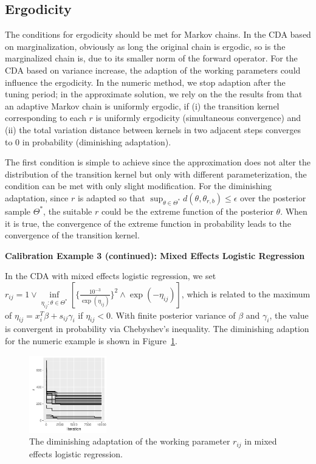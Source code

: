 \documentclass[10pt]{article}
\newcommand{\xbeta}{ x_i^T \beta}
\begin{document}
\subsection{Ergodicity}

The conditions for ergodicity should be met for Markov chains. In the CDA based on marginalization, obviously as long the original chain is ergodic, so is the marginalized chain is, due to its smaller norm of the forward operator. For the CDA based on variance increase, the adaption of the working parameters could influence the ergodicity. In the numeric method, we stop adaption after the tuning period; in the approximate solution, we rely on the the results from \cite{roberts2007coupling} that an adaptive Markov chain is uniformly ergodic, if (i) the transition kernel corresponding to each $r$ is uniformly ergodicity (simultaneous convergence) and (ii) the total variation distance between kernels in two adjacent steps converges to $0$ in probability (diminishing adaptation).

The first condition is simple to achieve since the approximation does not alter the distribution of the transition kernel but only with different parameterization, the condition can be met with only slight modification. For the diminishing adaptation, since $r$ is adapted so that $\sup_{\theta \in \varTheta^*} d(\theta, \theta_{r,b})\le \epsilon$ over the posterior sample $\varTheta^*$, the suitable $r$ could be the extreme function of the posterior $\theta$. When it is true, the convergence of the extreme function in probability leads to the convergence of the transition kernel.

{\bf Calibration Example 3 (continued): Mixed Effects Logistic Regression}

In the CDA with mixed effects logistic regression, we set $r_{ij} =  1 \vee \underset{\eta_{ij}: \theta\in \varTheta^*}{\inf}[\{\frac{10^{-3} }{\exp(\eta_{ij})}\}^2  \wedge {\exp(-\eta_{ij})} ]   $, which is related to the maximum of $\eta_{ij}=\xbeta+s_{ij}\gamma_i$ if $\eta_{ij}<0$. With finite posterior variance of $\beta$ and $\gamma_i$, the value is convergent in probability via Chebyshev's inequality. The diminishing adaption for the numeric example is shown in Figure~\ref{diminishing_adapt}.

 \begin{figure}[H]
 \centering
 \includegraphics[width=0.3\textwidth]{r_adaptation.pdf}
  \caption{The diminishing adaptation of the working parameter $r_{ij}$ in mixed effects logistic regression.}
  \label{diminishing_adapt}
 \end{figure}
\end{document}

